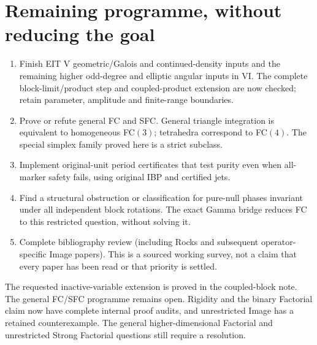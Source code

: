 \documentclass[11pt]{article}
\begin{document}
\section*{Remaining programme, without reducing the goal}
\begin{enumerate}
\item Finish EIT V geometric/Galois and continued-density inputs and
      the remaining higher odd-degree and elliptic angular inputs in VI.
      The complete block-limit/product step and coupled-product extension
      are now checked; retain parameter, amplitude and finite-range boundaries.
\item Prove or refute general FC and SFC. General triangle integration is
      equivalent to homogeneous FC$(3)$; tetrahedra correspond to FC$(4)$.
      The special simplex family proved here is a strict subclass.
\item Implement original-unit period certificates that test purity even
      when all-marker safety fails, using original IBP and certified jets.
\item Find a structural obstruction or classification for pure-null
      phases invariant under all independent block rotations. The exact
      Gamma bridge reduces FC to this restricted question, without solving it.
\item Complete bibliography review (including Rocks and subsequent
      operator-specific Image papers). This is a sourced working survey,
      not a claim that every paper has been read or that priority is settled.
\end{enumerate}
The requested inactive-variable extension is proved in the coupled-block
note. The general FC/SFC programme remains open. Rigidity and the binary Factorial
claim now have complete internal proof audits, and unrestricted Image
has a retained counterexample. The general higher-dimensional Factorial
and unrestricted Strong Factorial questions still require a resolution.
\end{document}
